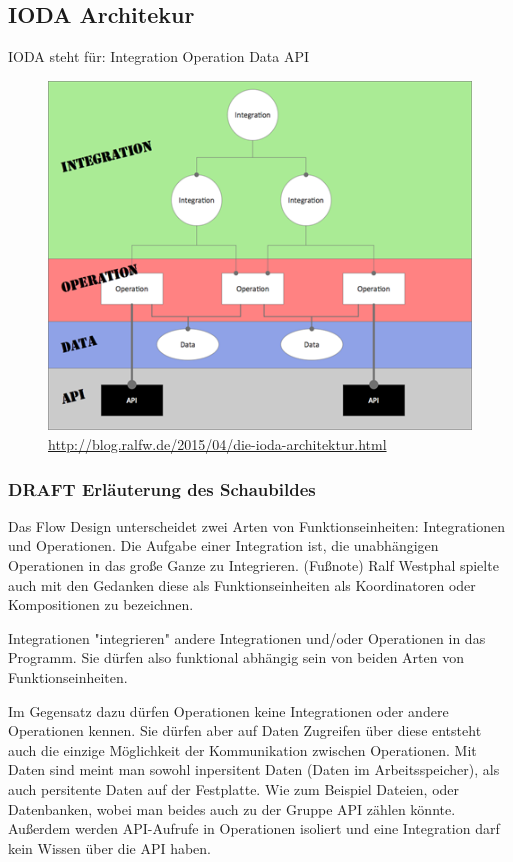 \documentclass[11pt]{article}
\begin{document}
\subsection{IODA Architekur}
\label{sec:orgheadline24}
IODA steht für: Integration Operation Data API
\begin{figure}[htb]
\centering
\includegraphics[width=.9\linewidth]{./img/ioda1.png}
\caption{\url{http://blog.ralfw.de/2015/04/die-ioda-architektur.html}}
\end{figure}

\subsubsection{{\bfseries\sffamily DRAFT} Erläuterung des Schaubildes}
\label{sec:orgheadline18}
Das Flow Design unterscheidet zwei Arten von Funktionseinheiten: Integrationen und Operationen.
Die Aufgabe einer Integration ist, die unabhängigen Operationen in das große Ganze zu
Integrieren. 
(Fußnote) Ralf Westphal spielte auch mit den Gedanken diese als Funktionseinheiten als Koordinatoren oder
Kompositionen zu bezeichnen.

Integrationen "integrieren" andere Integrationen und/oder Operationen in das Programm. Sie dürfen also funktional abhängig sein
von beiden Arten von Funktionseinheiten.

Im Gegensatz dazu dürfen Operationen keine Integrationen oder andere Operationen kennen. 
Sie dürfen aber auf Daten Zugreifen über diese entsteht auch die einzige Möglichkeit der Kommunikation zwischen Operationen.
Mit Daten sind meint man sowohl inpersitent Daten (Daten im Arbeitsspeicher), als auch persitente Daten auf der Festplatte.
Wie zum Beispiel Dateien, oder Datenbanken, wobei man beides auch zu der Gruppe API zählen könnte. 
Außerdem werden API-Aufrufe in Operationen isoliert und eine Integration darf kein Wissen über die API haben.
\end{document}
